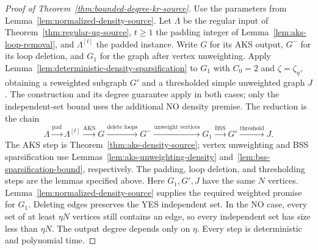 \begin{proof}[Proof of Theorem~\ref{thm:bounded-degree-kr-source}]
Use the parameters from Lemma~\ref{lem:normalized-density-source}.
Let $\Lambda$ be the regular input of
Theorem~\ref{thm:regular-ug-source}, $t\ge1$ the padding integer of
Lemma~\ref{lem:aks-loop-removal}, and $\Lambda^{[t]}$ the padded instance.
Write $G$ for its AKS output, $G^-$ for its loop deletion, and $G_1$
for the graph after vertex unweighting. Apply
Lemma~\ref{lem:deterministic-density-sparsification}
to $G_1$ with $C_0=2$ and $\zeta=\zeta_\eta$, obtaining a reweighted
subgraph $G'$ and a thresholded simple unweighted graph
$J$. The construction and its degree guarantee apply in both cases;
only the independent-set bound uses the additional NO density premise.
The reduction is the chain
\begin{equation}\label{eq:aks-construction-flow}
 \Lambda
 \xrightarrow{\text{pad}}
 \Lambda^{[t]}
 \xrightarrow{\text{AKS}}
 G
 \xrightarrow{\text{delete loops}}
 G^-
 \xrightarrow{\text{unweight vertices}}
 G_1
 \xrightarrow{\text{BSS}}
 G'
 \xrightarrow{\text{threshold}}
 J.
\end{equation}
The AKS step is Theorem~\ref{thm:aks-density-source}; vertex unweighting
and BSS sparsification use Lemmas~\ref{lem:aks-unweighting-density}
and~\ref{lem:bss-sparsification-bound}, respectively. The padding, loop deletion,
and thresholding steps are the lemmas specified above.
Here $G_1,G',J$ have the same $N$ vertices.
Lemma~\ref{lem:normalized-density-source} supplies the required
weighted promise for $G_1$. Deleting edges preserves the YES independent set.
In the NO case, every set of at least $\eta N$
vertices still contains an edge, so every independent set has size
less than $\eta N$. The output degree depends only on $\eta$.
Every step is deterministic and polynomial time.
\end{proof}

